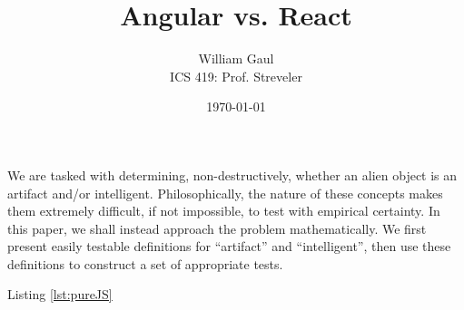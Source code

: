 \documentclass[12pt,letterpaper]{article}
\title{\textbf{Angular vs. React}}
\author{William Gaul\\{ICS 419: Prof. Streveler}}
\date{\today}
\begin{document}
\maketitle

We are tasked with determining, non-destructively, whether an alien object is an artifact and/or intelligent. Philosophically, the nature of these concepts makes them extremely difficult, if not impossible, to test with empirical certainty. In this paper, we shall instead approach the problem mathematically. We first present easily testable definitions for ``artifact'' and ``intelligent'', then use these definitions to construct a set of appropriate tests.





Listing \ref{lst:pureJS}






\end{document}
